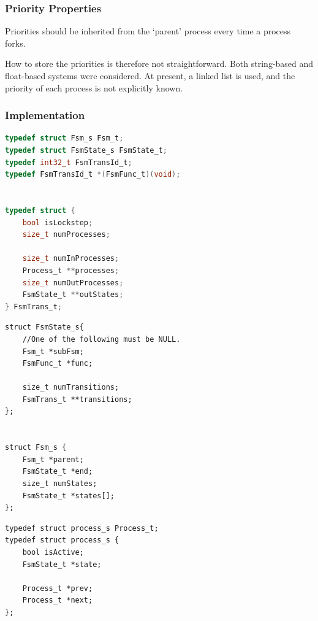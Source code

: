 \documentclass{beamer}
\begin{document}
	\begin{frame}
	\frametitle{Priority Properties}
	Priorities should be inherited from the `parent' process every time a process forks. 

	\vspace{1cm}

	How to store the priorities is therefore not straightforward. 
	Both string-based and float-based systems were considered. 
	At present, a linked list is used, and the priority of each process is not explicitly known. 
	\end{frame}


	\begin{frame}[fragile]
	\frametitle{Implementation}
		\begin{lstlisting}[language=c]
typedef struct Fsm_s Fsm_t;
typedef struct FsmState_s FsmState_t;
typedef int32_t FsmTransId_t;
typedef FsmTransId_t *(FsmFunc_t)(void);


typedef struct {
	bool isLockstep;
	size_t numProcesses; 

	size_t numInProcesses;
	Process_t **processes; 
	size_t numOutProcesses;
	FsmState_t **outStates; 
} FsmTrans_t;

		\end{lstlisting}


	\end{frame}


	\begin{frame}[fragile]
		\begin{lstlisting}
struct FsmState_s{
	//One of the following must be NULL. 
	Fsm_t *subFsm;
	FsmFunc_t *func;
	
	size_t numTransitions;
	FsmTrans_t **transitions;
};


struct Fsm_s {
	Fsm_t *parent;
	FsmState_t *end;
	size_t numStates;
	FsmState_t *states[]; 
};

		\end{lstlisting}
	\end{frame}


	\begin{frame}[fragile]
		\begin{lstlisting}
typedef struct process_s Process_t;
typedef struct process_s {
	bool isActive;
	FsmState_t *state;

	Process_t *prev;
	Process_t *next;
};

		\end{lstlisting}
	\end{frame}
\end{document}
